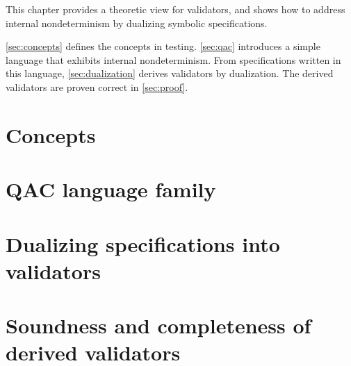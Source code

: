 This chapter provides a theoretic view for validators, and shows how to address
internal nondeterminism by dualizing symbolic specifications.

\autoref{sec:concepts} defines the concepts in testing.  \autoref{sec:qac}
introduces a simple language that exhibits internal nondeterminism.  From
specifications written in this language, \autoref{sec:dualization} derives
validators by dualization.  The derived validators are proven correct
in \autoref{sec:proof}.

\section{Concepts}
\label{sec:concepts}


\section{QAC language family}
\label{sec:qac}


\section{Dualizing specifications into validators}
\label{sec:dualization}


\section{Soundness and completeness of derived validators}
\label{sec:proof}

